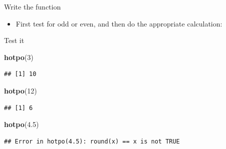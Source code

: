 \documentclass[ignorenonframetext,]{beamer}
\newenvironment{Shaded}{\begin{snugshade}}{\end{snugshade}}
\newcommand{\ControlFlowTok}[1]{\textcolor[rgb]{0.13,0.29,0.53}{\textbf{#1}}}
\newcommand{\DecValTok}[1]{\textcolor[rgb]{0.00,0.00,0.81}{#1}}
\newcommand{\FloatTok}[1]{\textcolor[rgb]{0.00,0.00,0.81}{#1}}
\newcommand{\KeywordTok}[1]{\textcolor[rgb]{0.13,0.29,0.53}{\textbf{#1}}}
\newcommand{\NormalTok}[1]{#1}
\newcommand{\OperatorTok}[1]{\textcolor[rgb]{0.81,0.36,0.00}{\textbf{#1}}}
\newcommand{\StringTok}[1]{\textcolor[rgb]{0.31,0.60,0.02}{#1}}
\providecommand{\tightlist}{%
  \setlength{\itemsep}{0pt}\setlength{\parskip}{0pt}}
\begin{document}
\begin{frame}[fragile]{Write the function}
\protect\hypertarget{write-the-function}{}

\begin{itemize}
\tightlist
\item
  First test for odd or even, and then do the appropriate calculation:
\end{itemize}

\begin{Shaded}
\end{Shaded}

\end{frame}

\begin{frame}[fragile]{Test it}
\protect\hypertarget{test-it}{}

\begin{Shaded}
\begin{Highlighting}[]
\KeywordTok{hotpo}\NormalTok{(}\DecValTok{3}\NormalTok{)}
\end{Highlighting}
\end{Shaded}

\begin{verbatim}
## [1] 10
\end{verbatim}

\begin{Shaded}
\begin{Highlighting}[]
\KeywordTok{hotpo}\NormalTok{(}\DecValTok{12}\NormalTok{)}
\end{Highlighting}
\end{Shaded}

\begin{verbatim}
## [1] 6
\end{verbatim}

\begin{Shaded}
\begin{Highlighting}[]
\KeywordTok{hotpo}\NormalTok{(}\FloatTok{4.5}\NormalTok{)}
\end{Highlighting}
\end{Shaded}

\begin{verbatim}
## Error in hotpo(4.5): round(x) == x is not TRUE
\end{verbatim}

\end{frame}
\end{document}
